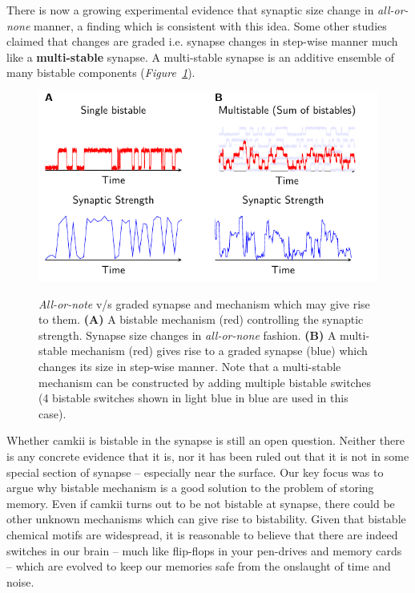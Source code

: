 \documentclass[]{resonance}
\newcommand\Fig[1]{\textit{Figure~\ref{#1}}}
\begin{document}
There is now a growing experimental evidence that synaptic size change in
\textit{all-or-none} manner, a finding which is consistent with this idea. Some
other studies claimed that changes are graded i.e. synapse changes in step-wise
manner much like a \textbf{multi-stable} synapse. A multi-stable synapse is an
additive ensemble of many bistable components
(\Fig{fig:fig_bistable_multistable}).

\begin{figure}[ht!]
    \centering
    \caption{\textit{All-or-note} v/s graded synapse and mechanism which may
        give rise to them. \textbf{(A)} A bistable mechanism (red) controlling the 
        synaptic strength.  Synapse size changes in \textit{all-or-none}
        fashion. \textbf{(B)} A multi-stable mechanism (red) gives rise to a graded synapse (blue) 
        which changes its size in step-wise manner. Note that a multi-stable
        mechanism can be constructed by adding multiple bistable switches (4
        bistable switches shown in light blue in blue are used in this case).
    }
    \includegraphics[width=\linewidth]{./bistable_multistabe_synapse.pdf}
    \label{fig:fig_bistable_multistable}
\end{figure}

Whether \gls{camkii} is bistable in the synapse is still an open question.
Neither there is any concrete evidence that it is, nor it has been ruled out
that it is not in some special section of synapse -- especially near the
surface. Our key focus was to argue why bistable mechanism is a good solution to
the problem of storing memory. Even if \gls{camkii} turns out to be not bistable
at synapse, there could be other unknown mechanisms which can give rise to
bistability. Given that bistable chemical motifs are widespread, it is
reasonable to believe that there are indeed switches in our brain -- much like
flip-flops in your pen-drives and memory cards -- which are evolved to keep our
memories safe from the onslaught of time and noise.
\end{document}
